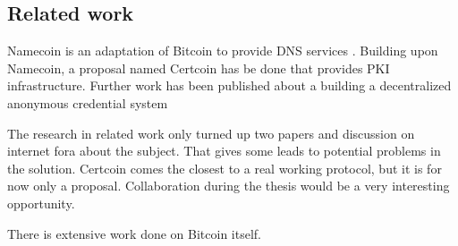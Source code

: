 \subsection{Related work}
Namecoin is an adaptation of Bitcoin to provide DNS services \cite{Namecoin}.
Building upon Namecoin, a proposal named Certcoin has be done that provides PKI infrastructure\cite{fromknecht2014certcoin}.
Further work has been published about a building a decentralized anonymous credential system\cite{garmandecentralized}

The research in related work only turned up two papers and discussion on internet fora about the subject.
That gives some leads to potential problems in the solution.
Certcoin comes the closest to a real working protocol,
but it is for now only a proposal. 
Collaboration during the thesis would be a very interesting opportunity.

There is extensive work done on Bitcoin itself.

